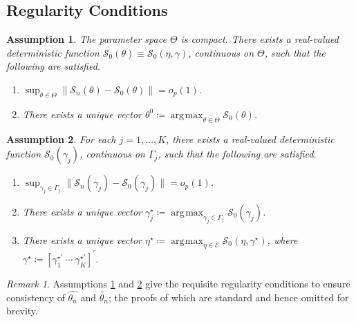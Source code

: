 \documentclass[12pt]{article}
\newtheorem{assumption}{Assumption}
\theoremstyle{definition}
\theoremstyle{remark}
\newtheorem{remark}{Remark}
\DeclareMathOperator*{\argmax}{\arg\!\max}
\begin{document}
\newpage

\setcounter{equation}{0}
\renewcommand{\theequation}{\thesection.\arabic{equation}}

\subsection{Regularity Conditions\label{subsec:regularity}}

\begin{assumption}
\label{ast:exp}
The parameter space $\Theta$ is compact. There exists a real-valued deterministic function $\mathcal{S}_0(\theta) \equiv \mathcal{S}_{0}(\eta, \gamma)$, continuous on $\Theta$, such that the following are satisfied.

\begin{enumerate}
\item $\sup_{\theta\in\Theta} \| \mathcal{S}_{n}(\theta) - \mathcal{S}_0(\theta) \| = o_p(1)$.
\item There exists a unique vector $\theta^0 \coloneqq \argmax_{\theta \in \Theta} \mathcal{S}_0(\theta)$.
\end{enumerate}
\end{assumption}

\begin{assumption}
\label{ast:exp2}
For each $j=1, \ldots, K$, there exists a real-valued deterministic function $\mathcal{S}_0(\gamma_j)$, continuous on $\Gamma_j$,
such that the following are satisfied.

\begin{enumerate}
\item $\sup_{\gamma_j\in\Gamma_j} \| \mathcal{S}_{n}(\gamma_j) - \mathcal{S}_0(\gamma_j) \| = o_p(1)$.
\item There exists a unique vector $\gamma^{\star}_j \coloneqq \argmax_{\gamma_j \in \Gamma_j} \mathcal{S}_0(\gamma_j)$.
\item There exists a unique vector $\eta^{\star} \coloneqq \argmax_{\eta \in \mathcal{E}} \mathcal{S}_0(\eta, \gamma^{\star})$, where $\gamma^{\star} \coloneqq [ \gamma^{\star \prime}_{1}\ \cdots\ \gamma^{\star \prime}_{K} ]^{\prime}$.
\end{enumerate}
\end{assumption}

\begin{remark}
Assumptions \ref{ast:exp} and \ref{ast:exp2} give the requisite regularity conditions to ensure consistency of $\hat{\theta_{n}}$ and $\tilde{\theta_{n}}$; the proofs of which are standard and hence omitted for brevity.
\end{remark}
\end{document}
